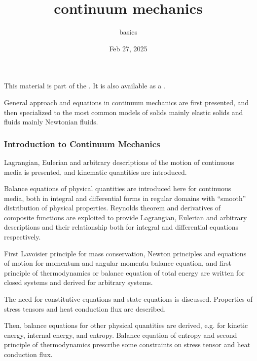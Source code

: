 \documentclass[letterpaper,10pt,english]{jupyterBook}
\title{continuum mechanics}
\date{Feb 27, 2025}
\author{basics}
\begin{document}
\pagestyle{empty}
\sphinxmaketitle
\pagestyle{plain}
\sphinxtableofcontents
\pagestyle{normal}
\label{\detokenize{intro::doc}}


\sphinxAtStartPar
This material is part of the . It is also available as a .

\sphinxAtStartPar
General approach and equations in continuum mechanics are first presented, and then specialized to the most common models of solids \sphinxhyphen{} mainly elastic solids \sphinxhyphen{} and fluids \sphinxhyphen{} mainly Newtonian fluids.
\subsubsection*{Introduction to Continuum Mechanics}

\sphinxAtStartPar
{} Lagrangian, Eulerian and arbitrary descriptions of the motion of continuous media is presented, and kinematic quantities are introduced.

\sphinxAtStartPar
{} Balance equations of physical quantities are introduced here for continuous media, both in integral and differential forms \sphinxhyphen{} in regular domains with “smooth” distribution of physical properties. Reynolds theorem and derivatives of composite functions are exploited to provide Lagrangian, Eulerian and arbitrary descriptions \sphinxhyphen{} and their relationship \sphinxhyphen{} both for integral and differential equations respectively.

\sphinxAtStartPar
First Lavoisier principle for mass conservation, Newton principles and equations of motion for momentum and angular momentu balance equation, and first principle of thermodynamics or balance equation of total energy are written for closed systems \sphinxhyphen{} and derived for arbitrary systems.

\sphinxAtStartPar
The need for constitutive equations and state equations is discussed. Properties of stress tensors and heat conduction flux are described.

\sphinxAtStartPar
Then, balance equations for other physical quantities are derived, e.g. for kinetic energy, internal energy, and entropy. Balance equation of entropy and second principle of thermodynamics prescribe some constraints on stress tensor and heat conduction flux.
\end{document}
